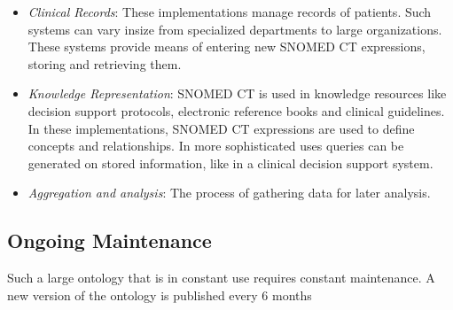 \documentclass[12pt,a4paper]{article}
\begin{document}
\begin{itemize}
\item \emph{Clinical Records}: These implementations manage records of patients. Such systems can vary insize from specialized departments to large organizations. These systems provide means of entering new SNOMED CT expressions, storing and retrieving them. \citep{snomedcttech2015}

\item \emph{Knowledge Representation}: SNOMED CT is used in knowledge resources like decision support protocols, electronic reference books and clinical guidelines. In these implementations, SNOMED CT expressions are used to define concepts and relationships. In more sophisticated uses queries can be generated on stored information, like in a clinical decision support system.\citep{snomedcttech2015}

\item \emph{Aggregation and analysis}: The process of gathering data for later analysis.\citep{snomedcttech2015}
\end{itemize}

\subsection{Ongoing Maintenance}

Such a large ontology that is in constant use requires constant maintenance. A new version of the ontology is published every 6 months \citep{snocr}

\end{document}
